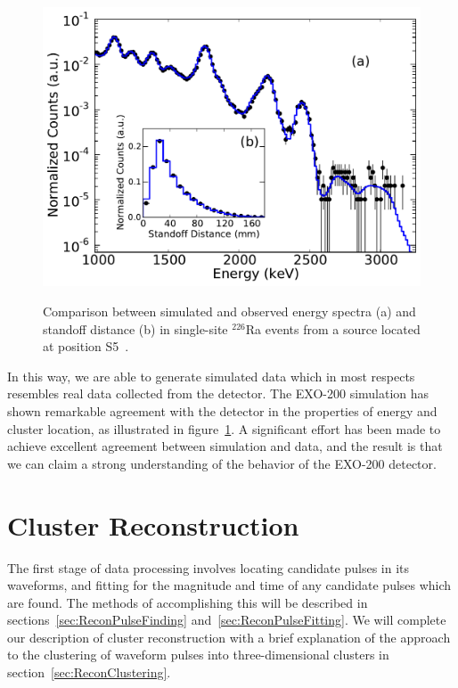 \begin{figure}
\begin{center}
\includegraphics[keepaspectratio=true,width=\textwidth]{SS_Ra226_Campaign7.pdf}
\end{center}
\renewcommand{\baselinestretch}{1}
\small\normalsize
\begin{quote}
\caption{Comparison between simulated and observed energy spectra (a) and standoff distance (b) in single-site $^{226}$Ra events from a source located at position S5~\cite{NewEXObb0nPaper_2014}.}
\label{fig:RaSourceMCComparison}
\end{quote}
\end{figure}
\renewcommand{\baselinestretch}{2}
\small\normalsize

In this way, we are able to generate simulated data which in most respects resembles real data collected from the detector.  The EXO-200 simulation has shown remarkable agreement with the detector in the properties of energy and cluster location, as illustrated in figure~\ref{fig:RaSourceMCComparison}.  A significant effort has been made to achieve excellent agreement between simulation and data, and the result is that we can claim a strong understanding of the behavior of the EXO-200 detector.

\section{Cluster Reconstruction}\label{sec:ResultReconstruction}

The first stage of data processing involves locating candidate pulses in its waveforms, and fitting for the magnitude and time of any candidate pulses which are found.  The methods of accomplishing this will be described in sections~\ref{sec:ReconPulseFinding} and~\ref{sec:ReconPulseFitting}.  We will complete our description of cluster reconstruction with a brief explanation of the approach to the clustering of waveform pulses into three-dimensional clusters in section~\ref{sec:ReconClustering}.

